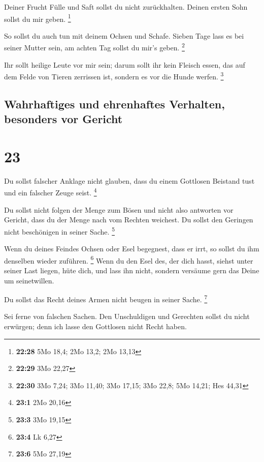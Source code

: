  Deiner Frucht Fülle und Saft sollst du nicht
zurückhalten. Deinen ersten Sohn sollst du mir geben. \footnote{\textbf{22:28}
  5Mo 18,4; 2Mo 13,2; 2Mo 13,13}

 So sollst du auch tun mit deinem Ochsen und Schafe.
Sieben Tage lass es bei seiner Mutter sein, am achten Tag sollst du
mir's geben. \footnote{\textbf{22:29} 3Mo 22,27}

 Ihr sollt heilige Leute vor mir sein; darum sollt ihr
kein Fleisch essen, das auf dem Felde von Tieren zerrissen ist, sondern
es vor die Hunde werfen. \footnote{\textbf{22:30} 3Mo 7,24; 3Mo 11,40;
  3Mo 17,15; 3Mo 22,8; 5Mo 14,21; Hes 44,31}

\hypertarget{wahrhaftiges-und-ehrenhaftes-verhalten-besonders-vor-gericht}{%
\subsection{Wahrhaftiges und ehrenhaftes Verhalten, besonders vor
Gericht}\label{wahrhaftiges-und-ehrenhaftes-verhalten-besonders-vor-gericht}}

\hypertarget{section-22}{%
\section{23}\label{section-22}}

 Du sollst falscher Anklage nicht glauben, dass du einem
Gottlosen Beistand tust und ein falscher Zeuge seist. \footnote{\textbf{23:1}
  2Mo 20,16}

 Du sollst nicht folgen der Menge zum Bösen und nicht also
antworten vor Gericht, dass du der Menge nach vom Rechten weichest.
 Du sollst den Geringen nicht beschönigen in seiner Sache.
\footnote{\textbf{23:3} 3Mo 19,15}

 Wenn du deines Feindes Ochsen oder Esel begegnest, dass
er irrt, so sollst du ihm denselben wieder zuführen. \footnote{\textbf{23:4}
  Lk 6,27}  Wenn du den Esel des, der dich hasst, siehst
unter seiner Last liegen, hüte dich, und lass ihn nicht, sondern
versäume gern das Deine um seinetwillen.

 Du sollst das Recht deines Armen nicht beugen in seiner
Sache. \footnote{\textbf{23:6} 5Mo 27,19}

 Sei ferne von falschen Sachen. Den Unschuldigen und
Gerechten sollst du nicht erwürgen; denn ich lasse den Gottlosen nicht
Recht haben.


